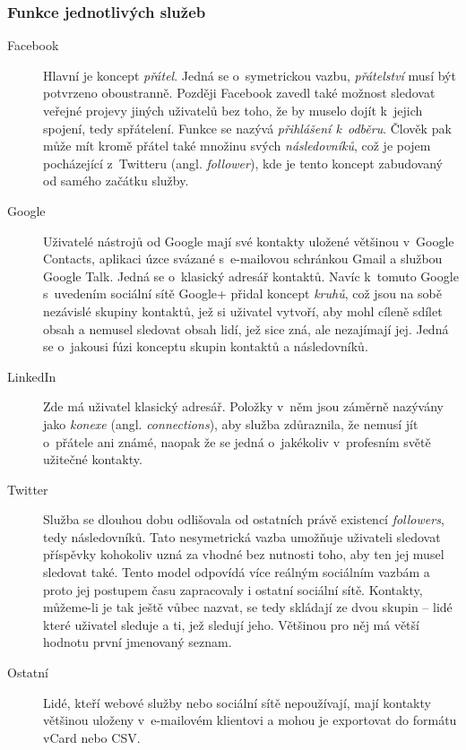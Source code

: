 \documentclass[12pt,oneside,final]{fithesis2}
\begin{document}
\subsubsection*{Funkce jednotlivých služeb}
\begin{description}
    \item[Facebook]
        Hlavní je koncept \emph{přátel}. Jedná se o~symetrickou vazbu, \emph{přátelství} musí být potvrzeno oboustranně. Později Facebook zavedl také možnost sledovat veřejné projevy jiných uživatelů bez toho, že by muselo dojít k~jejich spojení, tedy spřátelení. Funkce se nazývá \emph{přihlášení k~odběru}. Člověk pak může mít kromě přátel také množinu svých \emph{následovníků}, což je pojem pocházející z~Twitteru (angl. \emph{follower}), kde je tento koncept zabudovaný od samého začátku služby.

    \item[Google]
        Uživatelé nástrojů od Google mají své kontakty uložené většinou v~Google Contacts, aplikaci úzce svázané s~e-mailovou schránkou Gmail a službou Google Talk. Jedná se o~klasický adresář kontaktů. Navíc k~tomuto Google s~uvedením sociální sítě Google+ přidal koncept \emph{kruhů}, což jsou na sobě nezávislé skupiny kontaktů, jež si uživatel vytvoří, aby mohl cíleně sdílet obsah a nemusel sledovat obsah lidí, jež sice zná, ale nezajímají jej. Jedná se o~jakousi fúzi konceptu skupin kontaktů a následovníků.

    \item[LinkedIn]
        Zde má uživatel klasický adresář. Položky v~něm jsou záměrně nazývány jako \emph{konexe} (angl. \emph{connections}), aby služba zdůraznila, že nemusí jít o~přátele ani známé, naopak že se jedná o~jakékoliv v~profesním světě užitečné kontakty.

    \item[Twitter]
        Služba se dlouhou dobu odlišovala od ostatních právě existencí \emph{followers}, tedy následovníků. Tato nesymetrická vazba umožňuje uživateli sledovat příspěvky kohokoliv uzná za vhodné bez nutnosti toho, aby ten jej musel sledovat také. Tento model odpovídá více reálným sociálním vazbám a proto jej postupem času zapracovaly i ostatní sociální sítě. Kontakty, můžeme-li je tak ještě vůbec nazvat, se tedy skládají ze dvou skupin -- lidé které uživatel sleduje a ti, jež sledují jeho. Většinou pro něj má větší hodnotu první jmenovaný seznam.

    \item[Ostatní]
        Lidé, kteří webové služby nebo sociální sítě nepoužívají, mají kontakty většinou uloženy v~e-mailovém klientovi a mohou je exportovat do formátu vCard nebo CSV.
\end{description}
\end{document}
